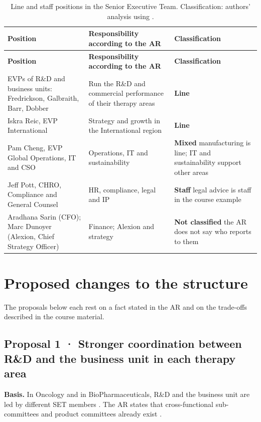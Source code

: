 \begin{xltabular}{\linewidth}{@{}YYY@{}}
\caption{Line and staff positions in the Senior Executive Team. Classification: authors' analysis using \cite[p.~8]{ORG}.}\label{tab:linha-staff}\\*
\toprule
\textbf{Position} & \textbf{Responsibility according to the AR} & \textbf{Classification} \\*
\midrule
\endfirsthead
\toprule
\textbf{Position} & \textbf{Responsibility according to the AR} & \textbf{Classification} \\*
\midrule
\endhead
\bottomrule
\endfoot
EVPs of R\&D and business units: Fredrickson, Galbraith, Barr, Dobber & Run the R\&D and commercial performance of their therapy areas \cite[p.~70]{AR} & \textbf{Line} \\
Iskra Reic, EVP International & Strategy and growth in the International region \cite[p.~70]{AR} & \textbf{Line} \\
Pam Cheng, EVP Global Operations, IT and CSO & Operations, IT and sustainability \cite[p.~70]{AR} & \textbf{Mixed} manufacturing is line; IT and sustainability support other areas \\
Jeff Pott, CHRO, Compliance and General Counsel & HR, compliance, legal and IP \cite[p.~70]{AR} & \textbf{Staff} legal advice is staff in the course example \\
Aradhana Sarin (CFO); Marc Dunoyer (Alexion, Chief Strategy Officer) & Finance; Alexion and strategy \cite[p.~70]{AR} & \textbf{Not classified} the AR does not say who reports to them \\
\end{xltabular}

\section{Proposed changes to the structure}

The proposals below each rest on a fact stated in the AR and on the trade-offs described in the course material.

\subsection{Proposal 1 · Stronger coordination between R\&D and the business unit in each therapy area}

\textbf{Basis.} In Oncology and in BioPharmaceuticals, R\&D and the business unit are led by different SET members \cite[p.~70]{AR}. The AR states that cross-functional sub-committees and product committees already exist \cite[p.~147]{AR}.

